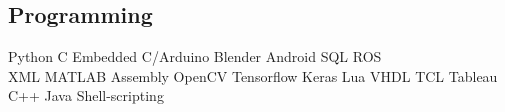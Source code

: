 \documentclass[]{deedy-resume-openfont}
\begin{document}
\begin{minipage}[t]{0.35\textwidth}
\subsection{Programming}
\textbullet{}Python \textbullet{}C \textbullet{}Embedded C/Arduino \textbullet{}Blender \textbullet{}Android \textbullet{}SQL \textbullet{}ROS \\ 
  \textbullet{}XML \textbullet{}MATLAB \textbullet{}Assembly \textbullet{}OpenCV \textbullet{}Tensorflow \textbullet{}Keras \textbullet{}Lua \textbullet{}VHDL \textbullet{}TCL \textbullet{}Tableau\\
\textbullet{}C++ \textbullet{}Java \textbullet{}Shell-scripting
\vspace{0.05in}
%
%

\end{minipage} 
\hfill\vline\hfill
\end{document}
